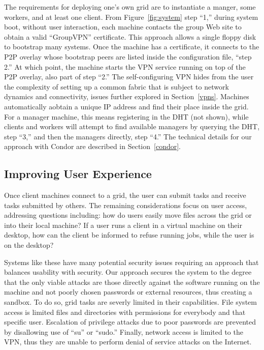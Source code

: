 \documentclass[conference]{IEEEtran}
\begin{document}
The requirements for deploying one's own grid are to instantiate a manger, some
workers, and at least one client.  From Figure~\ref{fig:system} step ``1,''
during system boot, without user interaction, each machine contacts the group
Web site to obtain a valid ``GroupVPN'' certificate.  This approach allows a
single floppy disk to bootstrap many systems.  Once the machine has a
certificate, it connects to the P2P overlay whose bootstrap peers are listed
inside the configuration file, ``step 2.''  At which point, the machine starts
the VPN service running on top of the P2P overlay, also part of step ``2.'' The
self-configuring VPN hides from the user the complexity of setting up a common
fabric that is subject to network dynamics and connectivity, issues further
explored in Section~\ref{vpns}.  Machines automatically aobtain a unique IP
address and find their place inside the grid.  For a manager machine, this
means registering in the DHT (not shown), while clients and workers will
attempt to find available managers by querying the DHT, step ``3,'' and then
the managers directly, step ``4.''  The technical details for our approach with
Condor are described in Section~\ref{condor}.

\subsection{Improving User Experience}

Once client machines connect to a grid, the user can submit tasks and receive
tasks submitted by others.  The remaining considerations focus on user access,
addressing questions including: how do users easily move files across the grid
or into their local machine?  If a user runs a client in a virtual machine on
their desktop, how can the client be informed to refuse running jobs, while the
user is on the desktop?

Systems like these have many potential security issues requiring an approach
that balances usability with security.  Our approach secures the system to the
degree that the only viable attacks are those directly against the software
running on the machine and not poorly chosen passwords or external resources,
thus creating a sandbox.  To do so, grid tasks are severly limited in their
capabilities.  File system access is limited files and directories with
permissions for everybody and that specific user.  Escalation of privilege
attacks due to poor passwords are prevented by disallowing use of ``su'' or
``sudo.'' Finally, network access is limited to the VPN, thus they are unable
to perform denial of service attacks on the Internet.
\end{document}

